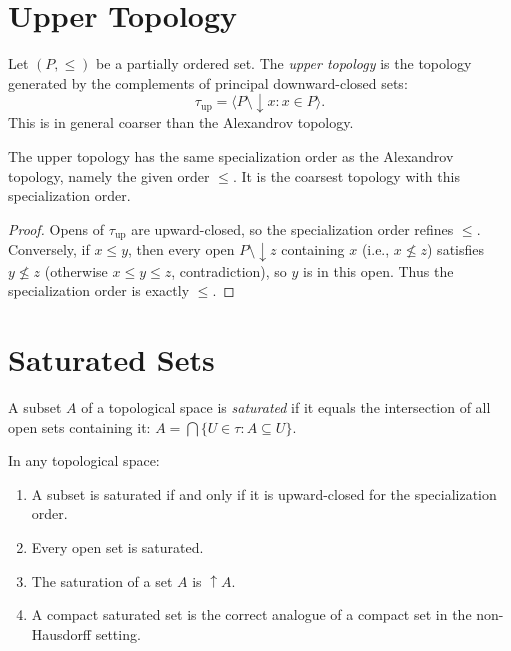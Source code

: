 \section{Upper Topology}

\begin{definition}
Let $(P, \leq)$ be a partially ordered set. The \emph{upper topology} is the topology
generated by the complements of principal downward-closed sets:
\[
  \tau_{\mathrm{up}} = \langle P \setminus \downarrow\! x : x \in P \rangle.
\]
This is in general coarser than the Alexandrov topology.
\end{definition}

\begin{proposition}
The upper topology has the same specialization order as the Alexandrov topology, namely
the given order $\leq$. It is the coarsest topology with this specialization order.
\end{proposition}

\begin{proof}
Opens of $\tau_{\mathrm{up}}$ are upward-closed, so the specialization order refines
$\leq$. Conversely, if $x \leq y$, then every open $P \setminus \downarrow\! z$ containing
$x$ (i.e., $x \not\leq z$) satisfies $y \not\leq z$ (otherwise $x \leq y \leq z$,
contradiction), so $y$ is in this open. Thus the specialization order is exactly $\leq$.
\end{proof}

\section{Saturated Sets}

\begin{definition}
A subset $A$ of a topological space is \emph{saturated} if it equals the intersection of
all open sets containing it:
$A = \bigcap\{U \in \tau : A \subseteq U\}$.
\end{definition}

\begin{proposition}
In any topological space:
\begin{enumerate}
  \item A subset is saturated if and only if it is upward-closed for the specialization
    order.
  \item Every open set is saturated.
  \item The saturation of a set $A$ is $\uparrow\! A$.
  \item A compact saturated set is the correct analogue of a compact set in the
    non-Hausdorff setting.
\end{enumerate}
\end{proposition}

